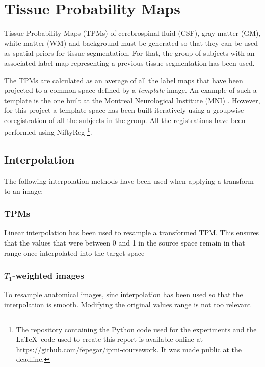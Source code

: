 \section{Tissue Probability Maps}



Tissue Probability Maps (TPMs) of cerebrospinal fluid (CSF), gray matter (GM), white matter (WM) and background must be generated so that they can be used as spatial priors for tissue segmentation. For that, the group of subjects with an associated label map representing a previous tissue segmentation has been used.


The TPMs are calculated as an average of all the label maps that have been projected to a common space defined by a \textit{template} image. An example of such a template is the one built at the Montreal Neurological Institute (MNI) \cite{evans_3d_1993}. However, for this project a template space has been built iteratively using a groupwise coregistration of all the subjects in the group. All the registrations have been performed using NiftyReg \cite{modat_global_2014}\footnote{The repository containing the Python code used for the experiments and the \LaTeX\ code used to create this report is available online at \href{https://github.com/fepegar/ipmi-coursework}{https://github.com/fepegar/ipmi-coursework}. It was made public at the deadline.}.


\subsection{Interpolation}
The following interpolation methods have been used when applying a transform to an image:

\subsubsection{TPMs}
Linear interpolation has been used to resample a transformed TPM. This ensures that the values that were between 0 and 1 in the source space remain in that range once interpolated into the target space

\subsubsection{$T_1$-weighted images} To resample anatomical images, sinc interpolation has been used so that the interpolation is smooth. Modifying the original values range is not too relevant

